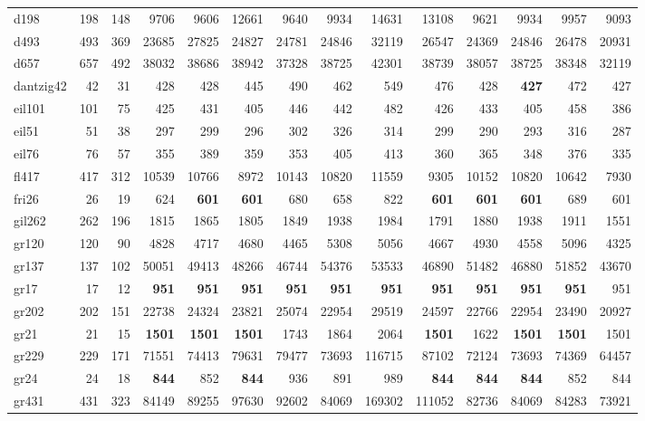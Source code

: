 {\begin{longtable}{l r r r r r r r r r r r r r}
d198 & 198 & 148 & 9706 & 9606 & 12661 & 9640 & 9934 & 14631 & 13108 & 9621 & 9934 & 9957 & 9093 \\
d493 & 493 & 369 & 23685 & 27825 & 24827 & 24781 & 24846 & 32119 & 26547 & 24369 & 24846 & 26478 & 20931 \\
d657 & 657 & 492 & 38032 & 38686 & 38942 & 37328 & 38725 & 42301 & 38739 & 38057 & 38725 & 38348 & 32119 \\
dantzig42 & 42 & 31 & 428 & 428 & 445 & 490 & 462 & 549 & 476 & 428 & \textbf{427} & 472 & 427 \\
eil101 & 101 & 75 & 425 & 431 & 405 & 446 & 442 & 482 & 426 & 433 & 405 & 458 & 386 \\
eil51 & 51 & 38 & 297 & 299 & 296 & 302 & 326 & 314 & 299 & 290 & 293 & 316 & 287 \\
eil76 & 76 & 57 & 355 & 389 & 359 & 353 & 405 & 413 & 360 & 365 & 348 & 376 & 335 \\
fl417 & 417 & 312 & 10539 & 10766 & 8972 & 10143 & 10820 & 11559 & 9305 & 10152 & 10820 & 10642 & 7930 \\
fri26 & 26 & 19 & 624 & \textbf{601} & \textbf{601} & 680 & 658 & 822 & \textbf{601} & \textbf{601} & \textbf{601} & 689 & 601 \\
gil262 & 262 & 196 & 1815 & 1865 & 1805 & 1849 & 1938 & 1984 & 1791 & 1880 & 1938 & 1911 & 1551 \\
gr120 & 120 & 90 & 4828 & 4717 & 4680 & 4465 & 5308 & 5056 & 4667 & 4930 & 4558 & 5096 & 4325 \\
gr137 & 137 & 102 & 50051 & 49413 & 48266 & 46744 & 54376 & 53533 & 46890 & 51482 & 46880 & 51852 & 43670 \\
gr17 & 17 & 12 & \textbf{951} & \textbf{951} & \textbf{951} & \textbf{951} & \textbf{951} & \textbf{951} & \textbf{951} & \textbf{951} & \textbf{951} & \textbf{951} & 951 \\
gr202 & 202 & 151 & 22738 & 24324 & 23821 & 25074 & 22954 & 29519 & 24597 & 22766 & 22954 & 23490 & 20927 \\
gr21 & 21 & 15 & \textbf{1501} & \textbf{1501} & \textbf{1501} & 1743 & 1864 & 2064 & \textbf{1501} & 1622 & \textbf{1501} & \textbf{1501} & 1501 \\
gr229 & 229 & 171 & 71551 & 74413 & 79631 & 79477 & 73693 & 116715 & 87102 & 72124 & 73693 & 74369 & 64457 \\
gr24 & 24 & 18 & \textbf{844} & 852 & \textbf{844} & 936 & 891 & 989 & \textbf{844} & \textbf{844} & \textbf{844} & 852 & 844 \\
gr431 & 431 & 323 & 84149 & 89255 & 97630 & 92602 & 84069 & 169302 & 111052 & 82736 & 84069 & 84283 & 73921 \\

\end{longtable}}
